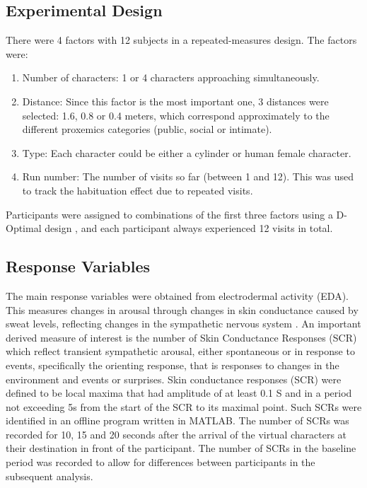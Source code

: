 \documentclass[
		twoside,openright,titlepage,numbers=noenddot,manychapters,
		headinclude,%
                footinclude=false,cleardoublepage=empty,
                BCOR=5mm,
		fontsize=11pt, %
                 enabledeprecatedfontcommands]{scrreprt}
\begin{document}
\subsection{ Experimental Design }

There were 4 factors with 12 subjects in a repeated-measures design. The factors were:
\begin{enumerate}
\item{	Number of characters:} 1 or 4 characters approaching simultaneously.
\item{Distance:} Since this factor is the most important one, 3 distances were selected: 1.6, 0.8 or 0.4 meters, which correspond approximately to the different proxemics categories (public, social or intimate).
\item{Type:} Each character could be either a cylinder or human female character.
\item{Run number:} The number of visits so far (between 1 and 12). This was used to track the habituation effect due to repeated visits. 
\end{enumerate}
Participants were assigned to combinations of the first three factors using a D-Optimal design \cite[]{dror2006red}, and each participant always experienced 12 visits in total. 


\subsection{Response Variables}
The main response variables were obtained from electrodermal activity (EDA). This measures changes in arousal through changes in skin conductance caused by sweat levels, reflecting changes in the sympathetic nervous system \cite[]{boucsein1992electrodermal}. An important derived measure of interest is the number of Skin Conductance Responses (SCR) which reflect transient sympathetic arousal, either spontaneous or in response to events, specifically the orienting response, that is responses to changes in the environment and events or surprises. Skin conductance responses (SCR) were defined to be local maxima that had amplitude of at least 0.1  S and in a period not exceeding 5s from the start of the SCR to its maximal point. Such SCRs were identified in an offline program written in MATLAB. The number of SCRs was recorded for 10, 15 and 20 seconds after the arrival of the virtual characters at their destination in front of the participant. The number of SCRs in the baseline period was recorded to allow for differences between participants in the subsequent analysis.
\end{document}
